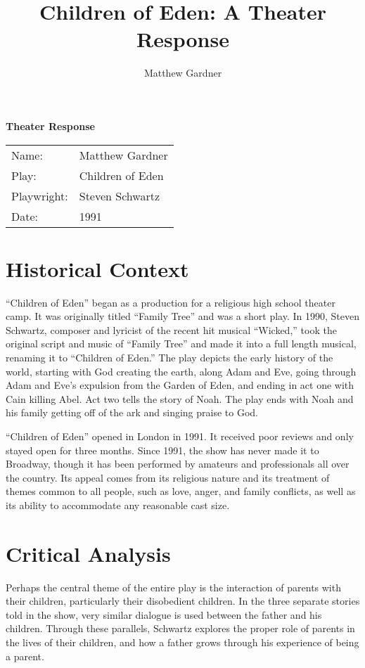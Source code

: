 \documentclass[onecolumn, 12pt]{article}
\title{Children of Eden: A Theater Response}
\author{Matthew Gardner}
\date{}
\begin{document}
\textbf{Theater Response}

\begin{tabular}{ll}
  Name:&Matthew Gardner \\
  Play:&Children of Eden \\
  Playwright:&Steven Schwartz \\
  Date:&1991 \\
\end{tabular}

\section*{Historical Context}

``Children of Eden'' began as a production for a religious high school theater
camp.  It was originally titled ``Family Tree'' and was a short play.  In 1990,
Steven Schwartz, composer and lyricist of the recent hit musical ``Wicked,''
took the original script and music of ``Family Tree'' and made it into a full
length musical, renaming it to ``Children of Eden.''  The play depicts the
early history of the world, starting with God creating the earth, along Adam
and Eve, going through Adam and Eve's expulsion from the Garden of Eden, and
ending in act one with Cain killing Abel.  Act two tells the story of Noah.
The play ends with Noah and his family getting off of the ark and singing
praise to God.

``Children of Eden'' opened in London in 1991.  It received poor reviews and
only stayed open for three months.  Since 1991, the show has never made it to
Broadway, though it has been performed by amateurs and professionals all over
the country.  Its appeal comes from its religious nature and its treatment of
themes common to all people, such as love, anger, and family conflicts, as well
as its ability to accommodate any reasonable cast size.

\section*{Critical Analysis}

Perhaps the central theme of the entire play is the interaction of parents with
their children, particularly their disobedient children.  In the three separate
stories told in the show, very similar dialogue is used between the father and
his children.  Through these parallels, Schwartz explores the proper role of
parents in the lives of their children, and how a father grows through his
experience of being a parent.
\end{document}
